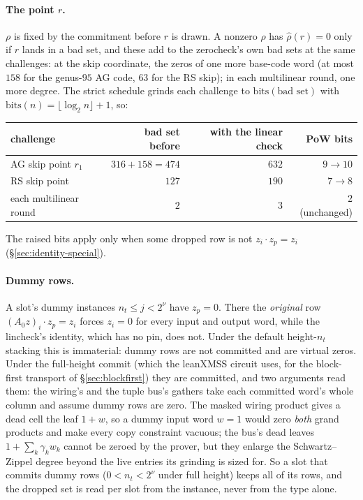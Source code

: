 \documentclass[11pt]{article}
\begin{document}
\paragraph{The point $r$.} $\rho$ is fixed by the commitment before $r$
is drawn. A nonzero $\rho$ has $\hat\rho(r) = 0$ only if $r$ lands in a
bad set, and these add to the zerocheck's own bad sets at the same
challenges: at the skip coordinate, the zeros of one more base-code word
(at most $158$ for the genus-$95$ AG code, $63$ for the RS skip); in each
multilinear round, one more degree. The strict schedule grinds each
challenge to $\mathrm{bits}(\text{bad set})$ with
$\mathrm{bits}(n) = \lfloor\log_2 n\rfloor + 1$, so:
\begin{center}
\small
\begin{tabular}{@{}lrrr@{}}
\toprule
challenge & bad set before & with the linear check & PoW bits\\
\midrule
AG skip point $r_1$ & $316 + 158 = 474$ & $632$ & $9\to10$\\
RS skip point & $127$ & $190$ & $7\to8$\\
each multilinear round & $2$ & $3$ & $2$ (unchanged)\\
\bottomrule
\end{tabular}
\end{center}
The raised bits apply only when some dropped row is not $z_i\cdot z_p = z_i$
(\S\ref{sec:identity-special}).

\paragraph{Dummy rows.} A slot's dummy instances $n_t\le j<2^\nu$ have
$z_p = 0$. There the \emph{original} row $(A_0z)_i\cdot z_p = z_i$ forces
$z_i = 0$ for every input and output word, while the lincheck's identity,
which has no pin, does not. Under the default height-$n_t$ stacking this
is immaterial: dummy rows are not committed and are virtual zeros. Under
the full-height commit (which the leanXMSS circuit uses, for the
block-first transport of \S\ref{sec:blockfirst}) they are committed, and
two arguments read them: the wiring's and the tuple bus's gathers take
each committed word's whole column and assume dummy rows are zero. The
masked wiring product gives a dead cell the leaf $1 + w$, so a dummy
input word $w = 1$ would zero \emph{both} grand products and make every
copy constraint vacuous; the bus's dead leaves $1 + \sum_k\gamma_k w_k$
cannot be zeroed by the prover, but they enlarge the Schwartz--Zippel
degree beyond the live entries its grinding is sized for. So a slot that
commits dummy rows ($0 < n_t < 2^\nu$ under full height) keeps all of its
rows, and the dropped set is read per slot from the instance, never from
the type alone.
\end{document}
